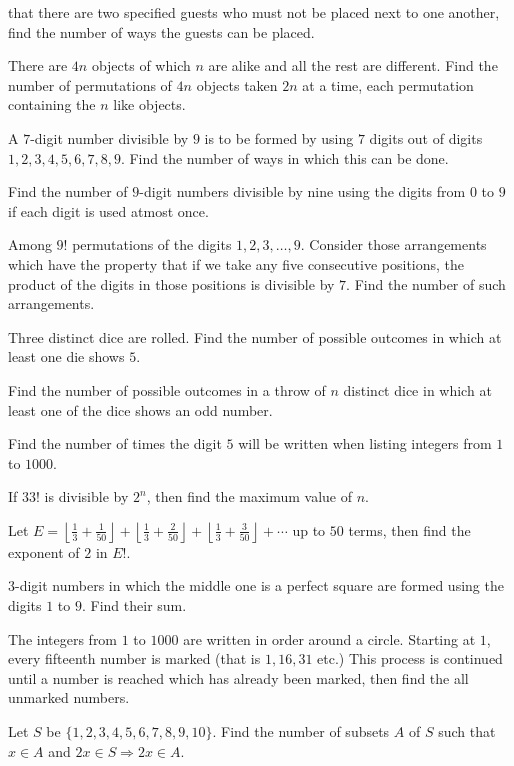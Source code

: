   that there are two specified guests who must not be placed next to one another, find the number of ways the guests can be placed.
\item There are $4n$ objects of which $n$ are alike and all the rest are different. Find the number of permutations of $4n$ objects
  taken $2n$ at a time, each permutation containing the $n$ like objects.
\item A $7$-digit number divisible by $9$ is to be formed by using $7$ digits out of digits $1, 2, 3, 4, 5,
  6, 7, 8, 9$. Find the number of ways in which this can be done.
\item Find the number of $9$-digit numbers divisible by nine using the digits from $0$ to $9$ if each digit
  is used atmost once.
\item Among $9!$ permutations of the digits $1, 2, 3, \ldots, 9$. Consider those arrangements which have the
  property that if we take any five consecutive positions, the product of the digits in those positions is
  divisible by $7$. Find the number of such arrangements.
\item Three distinct dice are rolled. Find the number of possible outcomes in which at least one die shows
  $5$.
\item Find the number of possible outcomes in a throw of $n$ distinct dice in which at least one of the dice
  shows an odd number.
\item Find the number of times the digit $5$ will be written when listing integers from $1$ to $1000$.
\item If $33!$ is divisible by $2^n$, then find the maximum value of $n$.
\item Let $E =\displaystyle \left\lfloor \frac{1}{3} + \frac{1}{50}\right\rfloor + \left\lfloor \frac{1}{3}
  + \frac{2}{50}\right\rfloor + \left\lfloor \frac{1}{3} + \frac{3}{50}\right\rfloor + \cdots$ up to $50$
  terms, then find the exponent of $2$ in $E!$.
\item $3$-digit numbers in which the middle one is a perfect square are formed using the digits $1$ to
  $9$. Find their sum.
\item The integers from $1$ to $1000$ are written in order around a circle. Starting at $1$, every fifteenth
  number is marked (that is $1, 16, 31$ etc.) This process is continued until a number is reached which has
  already been marked, then find the all unmarked numbers.
\item Let $S$ be $\{1, 2, 3, 4, 5, 6, 7, 8, 9, 10\}$. Find the number of subsets $A$ of $S$ such that $x \in
  A$ and $2x \in S \Rightarrow 2x\in A$.
